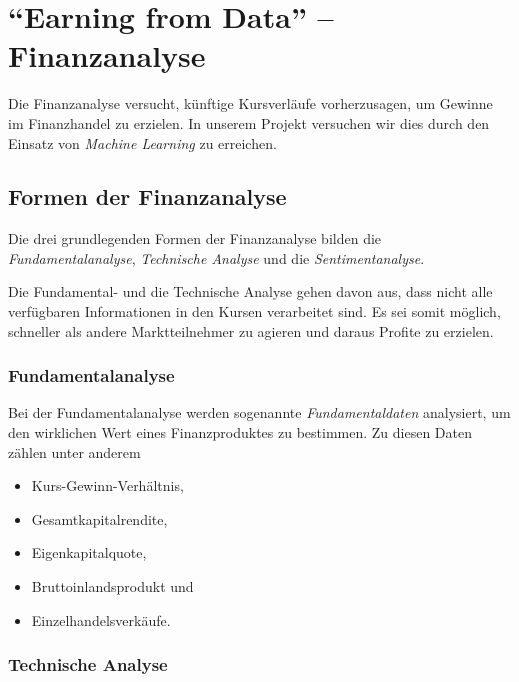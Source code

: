 \section{\enquote{Earning from Data} -- Finanzanalyse}
\author{Dennis Kempf, Moritz Hollenberg, Patrice Becker}
\label{sec:FinanzenIntro}

Die Finanzanalyse versucht, künftige Kursverläufe vorherzusagen, um Gewinne im Finanzhandel zu erzielen. In unserem Projekt versuchen wir dies durch den Einsatz von \emph{Machine Learning} zu erreichen.

\subsection{Formen der Finanzanalyse}
\author{Dennis Kempf}
\label{ssec:FinanzanalyseFormenIntro}

Die drei grundlegenden Formen der Finanzanalyse bilden die \emph{Fundamentalanalyse}, \emph{Technische Analyse} und die \emph{Sentimentanalyse}. 

Die Fundamental- und die Technische Analyse gehen davon aus, dass nicht alle verfügbaren Informationen in den Kursen verarbeitet sind. Es sei somit möglich, schneller als andere Marktteilnehmer zu agieren und daraus Profite zu erzielen.

\subsubsection{Fundamentalanalyse}
\author{Dennis Kempf}
\label{sssec:Fundamentalanalyse}

Bei der Fundamentalanalyse werden sogenannte \emph{Fundamentaldaten} analysiert, um den wirklichen Wert eines Finanzproduktes zu bestimmen. Zu diesen Daten zählen unter anderem
\begin{itemize}
	\item Kurs-Gewinn-Verhältnis,
	\item Gesamtkapitalrendite,
	\item Eigenkapitalquote,
	\item Bruttoinlandsprodukt und
	\item Einzelhandelsverkäufe.
\end{itemize}

\subsubsection{Technische Analyse}
\author{Dennis Kempf}
\label{sssec:TechnischeAnalyse}


